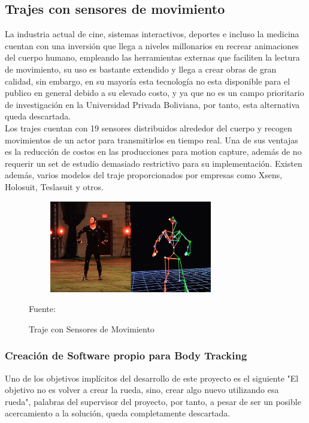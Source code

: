 \subsection{Trajes con sensores de movimiento}

La industria actual de cine, sistemas interactivos, deportes e incluso la medicina cuentan con una inversión que llega a niveles millonarios en recrear animaciones del cuerpo humano, empleando las herramientas externas que faciliten la lectura de movimiento, su uso es bastante extendido y llega a crear obras de gran calidad, sin embargo, en su mayoría esta tecnología no esta disponible para el publico en general debido a su elevado costo, y ya que no es un campo prioritario de investigación en la Universidad Privada Boliviana, por tanto, esta alternativa queda descartada.
\\
Los trajes cuentan con 19 sensores distribuidos alrededor del cuerpo y recogen movimientos de un actor para transmitirlos en tiempo real. Una de sus ventajas es la reducción de costos en las producciones para motion capture, además de no requerir un set de estudio demasiado restrictivo para su implementación. Existen además, varios modelos del traje proporcionados por empresas como Xsens, Holosuit, Teslasuit y otros.

\begin{figure}[t!]
	\centering
	\includegraphics[width=9cm,height=4cm,]{./Images/trajesensor.jpg}
	\caption{Traje con Sensores de Movimiento}
	\footnotesize Fuente: \cite{trajesensor}
	\label{trajesensores}
\end{figure}

\subsubsection{Creación de Software propio para Body Tracking}

Uno de los objetivos implícitos del desarrollo de este proyecto es el siguiente "El objetivo no es volver a crear la rueda, sino, crear algo nuevo utilizando esa rueda", palabras del supervisor del proyecto, por tanto, a pesar de ser un posible acercamiento a la solución, queda completamente descartada.

